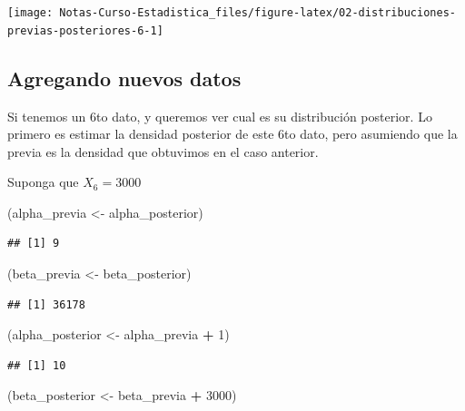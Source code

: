 \documentclass[
  12pt,
]{book}
\newenvironment{Shaded}{\begin{snugshade}}{\end{snugshade}}
\newcommand{\DecValTok}[1]{\textcolor[rgb]{0.00,0.00,0.81}{#1}}
\newcommand{\NormalTok}[1]{#1}
\newcommand{\OperatorTok}[1]{\textcolor[rgb]{0.81,0.36,0.00}{\textbf{#1}}}
\newcommand{\StringTok}[1]{\textcolor[rgb]{0.31,0.60,0.02}{#1}}
\begin{document}
\begin{center}\texttt{[image: Notas-Curso-Estadistica\_files/figure-latex/02-distribuciones-previas-posteriores-6-1]} \end{center}

\hypertarget{agregando-nuevos-datos}{%
\subsection{Agregando nuevos datos}\label{agregando-nuevos-datos}}

Si tenemos un 6to dato, y queremos ver cual es su distribución posterior. Lo primero es estimar la densidad posterior de este 6to dato, pero asumiendo que la previa es la densidad que obtuvimos en el caso anterior.

Suponga que \(X_6 = 3000\)

\begin{Shaded}
\begin{Highlighting}[]
\NormalTok{(alpha\_previa \textless{}{-}}\StringTok{ }\NormalTok{alpha\_posterior)}
\end{Highlighting}
\end{Shaded}

\begin{verbatim}
## [1] 9
\end{verbatim}

\begin{Shaded}
\begin{Highlighting}[]
\NormalTok{(beta\_previa \textless{}{-}}\StringTok{ }\NormalTok{beta\_posterior)}
\end{Highlighting}
\end{Shaded}

\begin{verbatim}
## [1] 36178
\end{verbatim}

\begin{Shaded}
\begin{Highlighting}[]
\NormalTok{(alpha\_posterior \textless{}{-}}\StringTok{ }\NormalTok{alpha\_previa }\OperatorTok{+}\StringTok{ }\DecValTok{1}\NormalTok{)}
\end{Highlighting}
\end{Shaded}

\begin{verbatim}
## [1] 10
\end{verbatim}

\begin{Shaded}
\begin{Highlighting}[]
\NormalTok{(beta\_posterior \textless{}{-}}\StringTok{ }\NormalTok{beta\_previa }\OperatorTok{+}\StringTok{ }\DecValTok{3000}\NormalTok{)}
\end{Highlighting}
\end{Shaded}
\end{document}
